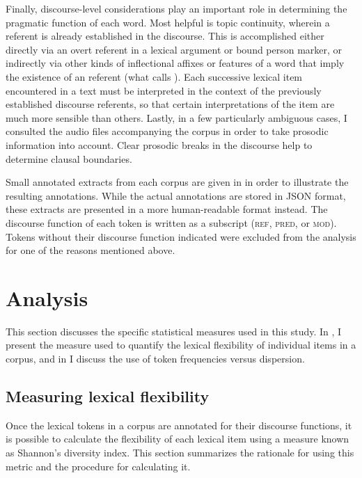 Finally, discourse-level considerations play an important role in determining the pragmatic function of each word. Most helpful is topic continuity, wherein a referent is already established in the discourse. This is accomplished either directly via an overt referent in a lexical argument or bound person marker, or indirectly via other kinds of inflectional affixes or features of a word that imply the existence of an referent (what \textcite{Kibrik2011} calls ). Each successive lexical item encountered in a text must be interpreted in the context of the previously established discourse referents, so that certain interpretations of the item are much more sensible than others. Lastly, in a few particularly ambiguous cases, I consulted the audio files accompanying the corpus in order to take prosodic information into account. Clear prosodic breaks in the discourse help to determine clausal boundaries.

Small annotated extracts from each corpus are given in  in order to illustrate the resulting annotations. While the actual annotations are stored in JSON format, these extracts are presented in a more human-readable format instead. The discourse function of each token is written as a subscript (\textsc{ref}, \textsc{pred}, or \textsc{mod}). Tokens without their discourse function indicated were excluded from the analysis for one of the reasons mentioned above.

\section{Analysis}
\label{sec:3.4}

This section discusses the specific statistical measures used in this study. In , I present the measure used to quantify the lexical flexibility of individual items in a corpus, and in  I discuss the use of token frequencies versus dispersion.

\subsection{Measuring lexical flexibility}
\label{sec:3.4.1}

Once the lexical tokens in a corpus are annotated for their discourse functions, it is possible to calculate the flexibility of each lexical item using a measure known as Shannon's diversity index. This section summarizes the rationale for using this metric and the procedure for calculating it.

